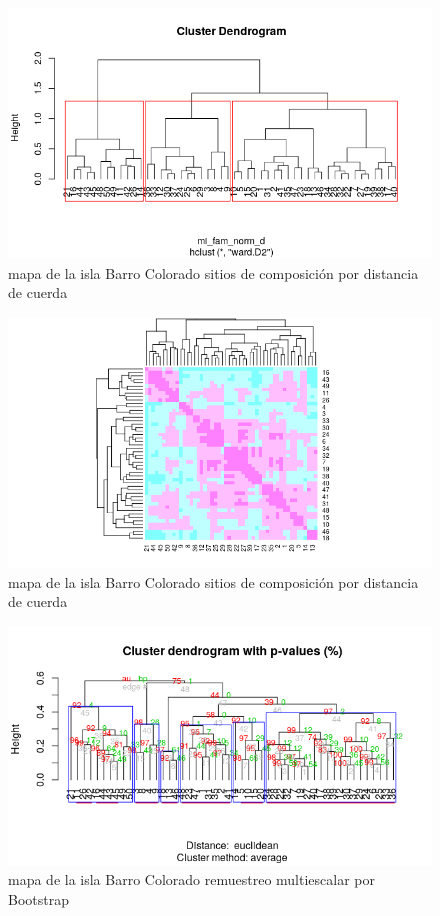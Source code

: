 \documentclass[11pt,]{article}
\begin{document}
\begin{figure}
\centering
\includegraphics[width=1.00000\textwidth]{agrupamiento_dendrograma.png}
\caption{mapa de la isla Barro Colorado sitios de composición por
distancia de cuerda \label{fig:bci_map}}
\end{figure}

\begin{figure}
\centering
\includegraphics[width=1.00000\textwidth]{comparacion_dendrograma_mapa_calor.png}
\caption{mapa de la isla Barro Colorado sitios de composición por
distancia de cuerda \label{fig:bci_map}}
\end{figure}

\begin{figure}
\centering
\includegraphics[width=1.00000\textwidth]{multiescalar_bootstrap.png}
\caption{mapa de la isla Barro Colorado remuestreo multiescalar por
Bootstrap \label{fig:bci_map}}
\end{figure}
\end{document}
